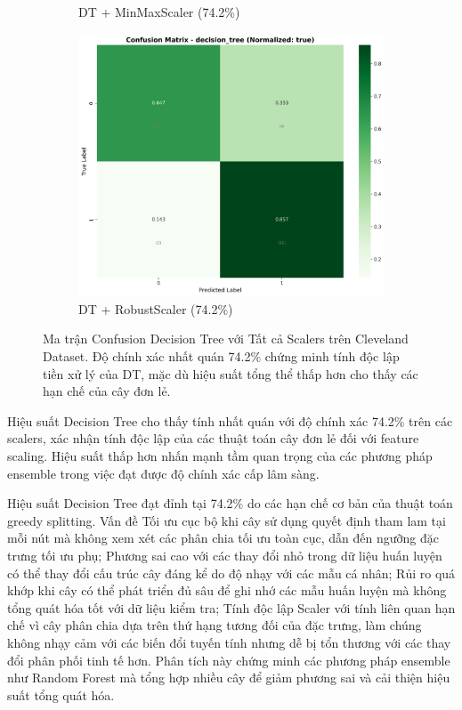 \begin{figure}[H]
\begin{subfigure}[b]{0.315\textwidth}
\caption{DT + MinMaxScaler (74.2\%)}
\label{fig:dt_minmaxscaler}
\end{subfigure}
\hfill
\begin{subfigure}[b]{0.315\textwidth}
\centering
\includegraphics[width=1\textwidth]{Result/cleveland_dataset/confusion_matrices/decision_tree_numeric_dataset_RobustScaler.png}
\caption{DT + RobustScaler (74.2\%)}

\label{fig:dt_robustscaler}
\end{subfigure}

\caption{Ma trận Confusion Decision Tree với Tất cả Scalers trên Cleveland Dataset. Độ chính xác nhất quán 74.2\% chứng minh tính độc lập tiền xử lý của DT, mặc dù hiệu suất tổng thể thấp hơn cho thấy các hạn chế của cây đơn lẻ.}
\label{fig:dt_all_scalers}
\end{figure}

Hiệu suất Decision Tree cho thấy tính nhất quán với độ chính xác 74.2\% trên các scalers, xác nhận tính độc lập của các thuật toán cây đơn lẻ đối với feature scaling. Hiệu suất thấp hơn nhấn mạnh tầm quan trọng của các phương pháp ensemble trong việc đạt được độ chính xác cấp lâm sàng.

Hiệu suất Decision Tree đạt đỉnh tại 74.2\% do các hạn chế cơ bản của thuật toán greedy splitting. Vấn đề Tối ưu cục bộ khi cây sử dụng quyết định tham lam tại mỗi nút mà không xem xét các phân chia tối ưu toàn cục, dẫn đến ngưỡng đặc trưng tối ưu phụ; Phương sai cao với các thay đổi nhỏ trong dữ liệu huấn luyện có thể thay đổi cấu trúc cây đáng kể do độ nhạy với các mẫu cá nhân; Rủi ro quá khớp khi cây có thể phát triển đủ sâu để ghi nhớ các mẫu huấn luyện mà không tổng quát hóa tốt với dữ liệu kiểm tra; Tính độc lập Scaler với tính liên quan hạn chế vì cây phân chia dựa trên thứ hạng tương đối của đặc trưng, làm chúng không nhạy cảm với các biến đổi tuyến tính nhưng dễ bị tổn thương với các thay đổi phân phối tinh tế hơn. Phân tích này chứng minh các phương pháp ensemble như Random Forest mà tổng hợp nhiều cây để giảm phương sai và cải thiện hiệu suất tổng quát hóa.

